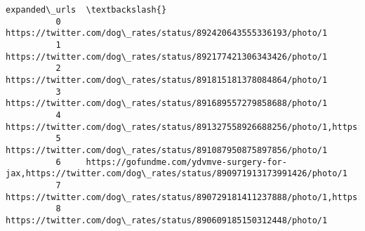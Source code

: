 \documentclass[11pt]{article}
\begin{document}
\begin{Verbatim}[commandchars=\\\{\}]
                                                                                                                                                                                                                                                                  expanded\_urls  \textbackslash{}
          0     https://twitter.com/dog\_rates/status/892420643555336193/photo/1                                                                                                                                                                                                   
          1     https://twitter.com/dog\_rates/status/892177421306343426/photo/1                                                                                                                                                                                                   
          2     https://twitter.com/dog\_rates/status/891815181378084864/photo/1                                                                                                                                                                                                   
          3     https://twitter.com/dog\_rates/status/891689557279858688/photo/1                                                                                                                                                                                                   
          4     https://twitter.com/dog\_rates/status/891327558926688256/photo/1,https://twitter.com/dog\_rates/status/891327558926688256/photo/1                                                                                                                                   
          5     https://twitter.com/dog\_rates/status/891087950875897856/photo/1                                                                                                                                                                                                   
          6     https://gofundme.com/ydvmve-surgery-for-jax,https://twitter.com/dog\_rates/status/890971913173991426/photo/1                                                                                                                                                       
          7     https://twitter.com/dog\_rates/status/890729181411237888/photo/1,https://twitter.com/dog\_rates/status/890729181411237888/photo/1                                                                                                                                   
          8     https://twitter.com/dog\_rates/status/890609185150312448/photo/1                                                                                                                                                                                                   

\end{Verbatim}
\end{document}
